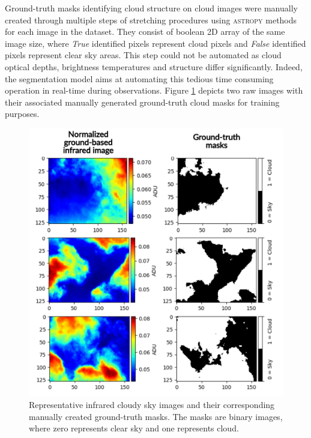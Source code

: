 \documentclass[amt, article]{copernicus}
\begin{document}
Ground-truth masks identifying cloud structure on cloud images were manually created through multiple steps of stretching procedures using \textsc{astropy} \citep{Astropy2013,Astropy2018} methods for each image in the dataset. They consist of boolean 2D array of the same image size, where \textit{True} identified pixels represent cloud pixels and \textit{False} identified pixels represent clear sky areas. This step could not be automated as cloud optical depths, brightness temperatures and structure differ significantly. Indeed, the segmentation model aims at automating this tedious time consuming operation in real-time during observations. Figure \ref{fig:cloud_images_ground_truth} depicts two raw images with their associated manually generated ground-truth cloud masks for training purposes.

\begin{figure}[t]
	\includegraphics[width=\hsize]{figures/cloud_images_ground_truth.pdf}
	\caption{Representative infrared cloudy sky images and their corresponding manually created ground-truth masks. The masks are binary images, where zero represents clear sky and one represents cloud.}
    \label{fig:cloud_images_ground_truth}
\end{figure}
\end{document}
